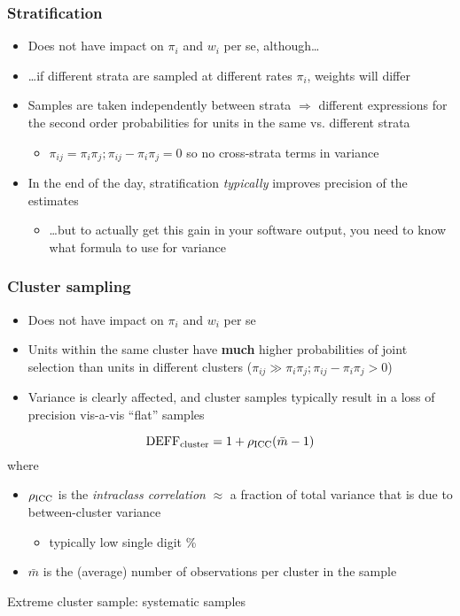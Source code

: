 \documentclass[aspectratio=43]{beamer}
\begin{document}
\begin{frame}\frametitle{Stratification}

\begin{itemize}
    \item Does not have impact on $\pi_i$ and $w_i$ per se, although\ldots
    \item \ldots if different strata are sampled at different rates $\pi_i$, weights will differ
    \item Samples are taken independently between strata $\Rightarrow$ different
        expressions for the second order probabilities for units in the same vs. different strata
        \begin{itemize}
            \item $\pi_{ij} = \pi_i \pi_j; \pi_{ij} - \pi_i \pi_j=0$ 
                  so no cross-strata terms in variance
        \end{itemize}
    \item In the end of the day, stratification \textit{typically} improves precision of the estimates
        \begin{itemize}
            \item \ldots but to actually get this gain in your software output,
                you need to know what formula to use for variance
        \end{itemize}
\end{itemize}

\end{frame}

\begin{frame}\frametitle{Cluster sampling}

\begin{itemize}
    \item Does not have impact on $\pi_i$ and $w_i$ per se
    \item Units within the same cluster have \textbf{much} higher probabilities of joint selection
        than units in different clusters ($\pi_{ij} \gg \pi_i \pi_j; \pi_{ij} - \pi_i \pi_j > 0$)
    \item Variance is clearly affected, and cluster samples typically result in a loss of precision
        vis-a-vis ``flat'' samples
\end{itemize}

$$
{\rm DEFF}_{\rm cluster} = 1 + \rho_{\rm ICC}(\bar m-1)
$$
where
\begin{itemize}
    \item $\rho_{\rm ICC}$ is the \textit{intraclass correlation} $\approx$
        a fraction of total variance that is due to between-cluster variance
        \begin{itemize} \item typically low single digit \citet{kolenikov:pitblado:2014} \% \end{itemize}
    \item $\bar m$ is the (average) number of observations per cluster in the sample
\end{itemize}

Extreme cluster sample: systematic samples

\end{frame}
\end{document}
